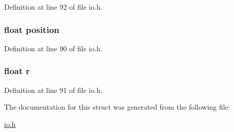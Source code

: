 Definition at line 92 of file io.\-h.

\hypertarget{structcolormapPoint__t_a76777b356ab2a080225682528119c4fe}{
\subsubsection[{position}]{\setlength{\rightskip}{0pt plus 5cm}float position}}\label{structcolormapPoint__t_a76777b356ab2a080225682528119c4fe}


Definition at line 90 of file io.\-h.

\hypertarget{structcolormapPoint__t_a4788d82c901b9367dd5c0daff8a7616b}{
\subsubsection[{r}]{\setlength{\rightskip}{0pt plus 5cm}float r}}\label{structcolormapPoint__t_a4788d82c901b9367dd5c0daff8a7616b}


Definition at line 91 of file io.\-h.



The documentation for this struct was generated from the following file\-:\begin{DoxyCompactItemize}
\item 
\hyperlink{io_8h}{io.\-h}\end{DoxyCompactItemize}
